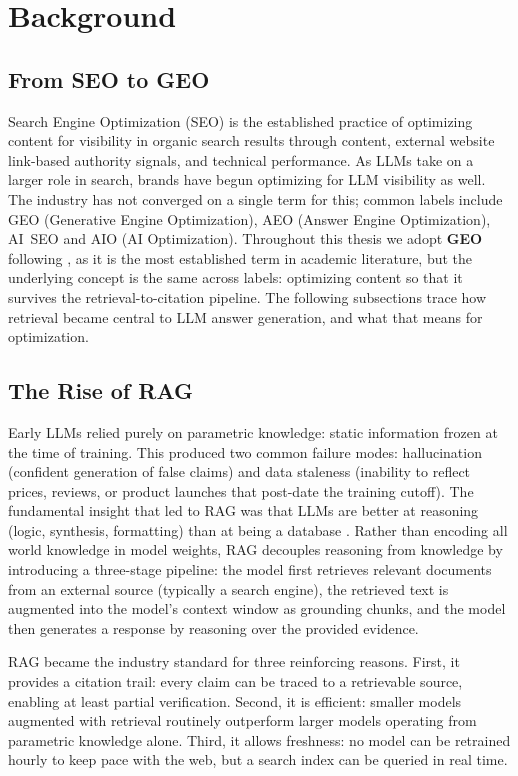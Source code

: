 \section{Background}
\label{sec:theoretical-framework}

\subsection{From SEO to GEO}
\label{sec:evolution-search}
Search Engine Optimization (SEO) is the established practice of optimizing content for visibility in organic search results through content, external website link-based authority signals, and technical performance. As LLMs take on a larger role in search, brands have begun optimizing for LLM visibility as well. The industry has not converged on a single term for this; common labels include GEO (Generative Engine Optimization), AEO (Answer Engine Optimization), AI~SEO and AIO (AI Optimization). Throughout this thesis we adopt \textbf{GEO} following \textcite{aggarwal2024geo}, as it is the most established term in academic literature, but the underlying concept is the same across labels: optimizing content so that it survives the retrieval-to-citation pipeline. The following subsections trace how retrieval became central to LLM answer generation, and what that means for optimization.

\subsection{The Rise of RAG}
\label{sec:rag-evolution}

Early LLMs relied purely on parametric knowledge: static information frozen at the time of training. This produced two common failure modes: hallucination (confident generation of false claims) and data staleness (inability to reflect prices, reviews, or product launches that post-date the training cutoff). The fundamental insight that led to RAG was that LLMs are better at reasoning (logic, synthesis, formatting) than at being a database \parencite{lewis2020rag}. Rather than encoding all world knowledge in model weights, RAG decouples reasoning from knowledge by introducing a three-stage pipeline: the model first retrieves relevant documents from an external source (typically a search engine), the retrieved text is augmented into the model's context window as grounding chunks, and the model then generates a response by reasoning over the provided evidence.

RAG became the industry standard for three reinforcing reasons. First, it provides a citation trail: every claim can be traced to a retrievable source, enabling at least partial verification. Second, it is efficient: smaller models augmented with retrieval routinely outperform larger models operating from parametric knowledge alone. Third, it allows freshness: no model can be retrained hourly to keep pace with the web, but a search index can be queried in real time.

